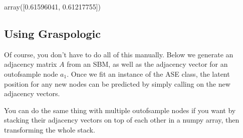 \documentclass[letterpaper,10pt,english]{jupyterBook}
\begin{document}
\begin{sphinxVerbatim}[commandchars=\\\{\}]
   

  

    
\end{sphinxVerbatim}

\begin{sphinxVerbatim}[commandchars=\\\{\}]
\end{sphinxVerbatim}

\begin{sphinxVerbatim}[commandchars=\\\{\}]
array([0.61596041, 0.61217755])
\end{sphinxVerbatim}

\noindent{}


\subsection{Using Graspologic}
\label{\detokenize{applications/ch8/out-of-sample:using-graspologic}}
\sphinxAtStartPar
Of course, you don’t have to do all of this manually. Below we generate an adjacency matrix \(A\) from an SBM, as well as the adjacency vector for an out\sphinxhyphen{}of\sphinxhyphen{}sample node \(a_1\). Once we fit an instance of the ASE class, the latent position for any new nodes can be predicted by simply calling  on the new adjacency vectors.

\sphinxAtStartPar
You can do the same thing with multiple out\sphinxhyphen{}of\sphinxhyphen{}sample nodes if you want by stacking their adjacency vectors on top of each other in a numpy array, then transforming the whole stack.
\end{document}
